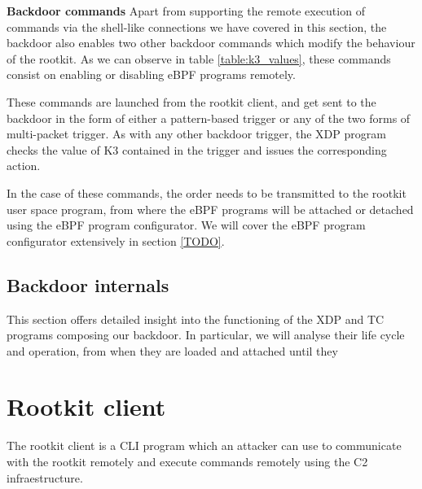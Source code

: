 \textbf{Backdoor commands}
Apart from supporting the remote execution of commands via the shell-like connections we have covered in this section, the backdoor also enables two other backdoor commands which modify the behaviour of the rootkit. As we can observe in table \ref{table:k3_values}, these commands consist on enabling or disabling eBPF programs remotely.

These commands are launched from the rootkit client, and get sent to the backdoor in the form of either a pattern-based trigger or any of the two forms of multi-packet trigger. As with any other backdoor trigger, the XDP program checks the value of K3 contained in the trigger and issues the corresponding action.

In the case of these commands, the order needs to be transmitted to the rootkit user space program, from where the eBPF programs will be attached or detached using the eBPF program configurator. We will cover the eBPF program configurator extensively in section \ref{TODO}.


\subsection{Backdoor internals}
This section offers detailed insight into the functioning of the XDP and TC programs composing our backdoor. In particular, we will analyse their life cycle and operation, from when they are loaded and attached until they 





\section{Rootkit client}
The rootkit client is a CLI program which an attacker can use to communicate with the rootkit remotely and execute commands remotely using the C2 infraestructure. 











